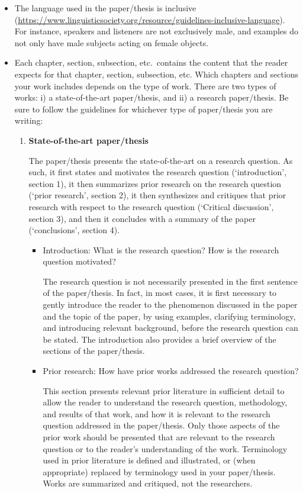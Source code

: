 \documentclass[11pt,fleqn,a4paper/thesis]{article}
\newcommand{\6}{\mbox{$[\hspace*{-.6mm}[$}}
\newcommand{\9}{\mbox{$]\hspace*{-.6mm}]$}}
\begin{document}
\begin{itemize}[itemsep=-1pt,leftmargin=2.5ex,topsep=-2pt]
\item The language used in the paper/thesis is inclusive (\url{https://www.linguisticsociety.org/resource/guidelines-inclusive-language}). For instance, speakers and listeners are not exclusively male, and examples do not only have male subjects acting on female objects.

\item Each chapter, section, subsection, etc.\ contains the content that the reader expects for that chapter, section, subsection, etc. Which chapters and sections your work includes depends on the type of work.  There are two types of works: i) a state-of-the-art paper/thesis, and ii) a research paper/thesis. Be sure to follow the guidelines for whichever type of paper/thesis you are writing:

\begin{enumerate}

\item {\bf State-of-the-art paper/thesis}

The paper/thesis presents the state-of-the-art on a research question. As such, it first states and motivates the research question (`introduction', section 1), it then summarizes prior research on the research question (`prior research', section 2), it then synthesizes and critiques that prior research with respect to the research question (`Critical discussion', section 3), and then it concludes with a summary of the paper (`conclusions', section 4).

\begin{itemize}[leftmargin=2.5ex,topsep=-2pt]

\item Introduction: What is the research question? How is the research question motivated?

The research question is not necessarily presented in the first sentence of the paper/thesis. In fact, in most cases, it is first necessary to gently introduce the reader to the phenomenon discussed in the paper and the topic of the paper, by using examples, clarifying terminology, and introducing relevant background, before the research question can be stated. The introduction also provides a brief overview of the sections of the paper/thesis.

\item Prior research: How have prior works addressed the research question? 

This section presents relevant prior literature in sufficient detail to allow the reader to understand the research question, methodology, and results of that work, and how it is relevant to the research question addressed in the paper/thesis. Only those aspects of the prior work should be presented that are relevant to the research question or to the reader's understanding of the work. Terminology used in prior literature is defined and illustrated, or (when appropriate) replaced by terminology used in your paper/thesis. Works are summarized and critiqued, not the researchers.


\end{itemize}
\end{enumerate}
\end{itemize}
\end{document}
